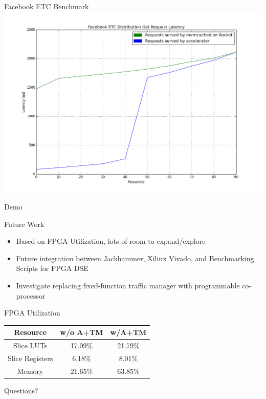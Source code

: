 \documentclass{beamer}
\begin{document}
\begin{frame}{Facebook ETC Benchmark}
    \includegraphics[width=\linewidth]{../img/facebook_etc_for_pres.png}
\end{frame}





\begin{frame}
    Demo
\end{frame}


\begin{frame}{Future Work}
    \begin{itemize}
        \item Based on FPGA Utilization, lots of room to expand/explore
        \item Future integration between Jackhammer, Xilinx Vivado, and Benchmarking Scripts for FPGA DSE
        \item Investigate replacing fixed-function traffic manager with programmable co-processor 
    \end{itemize}


\begin{center}
FPGA Utilization

\vspace{3mm}
\begin{tabular}{ | c | c | c |  } \hline
    Resource        & w/o A+TM & w/A+TM  \\ \hline
    Slice LUTs      & 17.09\%   &  21.79\%   \\  \hline
    Slice Registers & 6.18\%    &  8.01\%    \\  \hline
    Memory          & 21.65\%   &  63.85\%   \\  \hline
\end{tabular}
\end{center}
\end{frame}



\begin{frame}{Questions?}
\end{frame}
\end{document}
